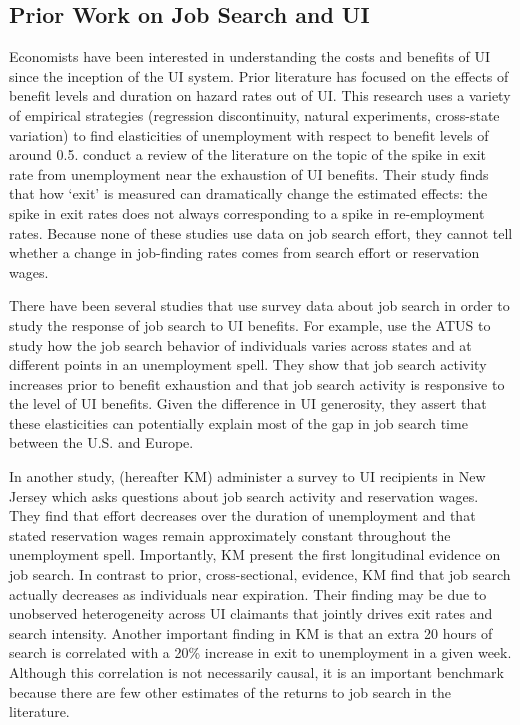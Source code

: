 \documentclass[12pt]{article}
\begin{document}
\begin{spacing}{2}
\section{Prior Work on Job Search and UI}
Economists have been interested in understanding the costs and benefits of UI since the inception of the UI system. Prior literature has focused on the effects of benefit levels and duration on hazard rates out of UI. This research uses a variety of empirical strategies (regression discontinuity, natural experiments, cross-state variation) to find elasticities of unemployment with respect to benefit levels of around 0.5. \cite{Card2007} conduct a review of the literature on the topic of the spike in exit rate from unemployment near the exhaustion of UI benefits. Their study finds that how `exit' is measured can dramatically change the estimated effects: the spike in exit rates does not always corresponding to a spike in re-employment rates. Because none of these studies use data on job search effort, they cannot tell whether a change in job-finding rates comes from search effort or reservation wages.

There have been several studies that use survey data about job search in order to study the response of job search to UI benefits. For example, \citet{Krueger2010} use the ATUS to study how the job search behavior of individuals varies across states and at different points in an unemployment spell. They show that job search activity increases prior to benefit exhaustion and that job search activity is responsive to the level of UI benefits. Given the difference in UI generosity, they assert that these elasticities can potentially explain most of the gap in job search time between the U.S. and Europe.

In another study, \citet{Krueger2011a}(hereafter KM) administer a survey to UI recipients in New Jersey which asks questions about job search activity and reservation wages. They find that effort decreases over the duration of unemployment and that stated reservation wages remain approximately constant throughout the unemployment spell. Importantly, KM present the first longitudinal evidence on job search. In contrast to prior, cross-sectional, evidence, KM find that job search actually decreases as individuals near expiration. Their finding may be due to unobserved heterogeneity across UI claimants that jointly drives exit rates and search intensity. Another important finding in KM is that an extra 20 hours of search is correlated with a 20\% increase in exit to unemployment in a given week. Although this correlation is not necessarily causal, it is an important benchmark because there are few other estimates of the returns to job search in the literature.


\end{spacing}
\end{document}
